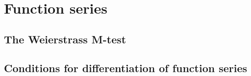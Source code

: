 \section{Function series}

\subsection{The Weierstrass M-test}

\subsection{Conditions for differentiation of function series}
